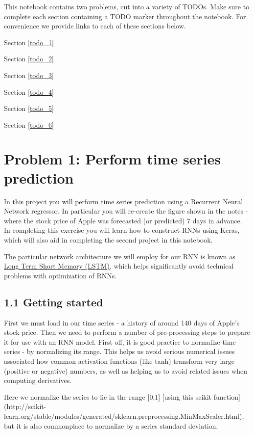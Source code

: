 \documentclass[11pt]{article}
\begin{document}
This notebook contains two problems, cut into a variety of TODOs. Make
sure to complete each section containing a TODO marker throughout the
notebook. For convenience we provide links to each of these sections
below.

Section \ref{todo_1}

Section \ref{todo_2}

Section \ref{todo_3}

Section \ref{todo_4}

Section \ref{todo_5}

Section \ref{todo_6}

    \section{Problem 1: Perform time series
prediction}\label{problem-1-perform-time-series-prediction}

In this project you will perform time series prediction using a
Recurrent Neural Network regressor. In particular you will re-create the
figure shown in the notes - where the stock price of Apple was
forecasted (or predicted) 7 days in advance. In completing this exercise
you will learn how to construct RNNs using Keras, which will also aid in
completing the second project in this notebook.

The particular network architecture we will employ for our RNN is known
as \href{https://en.wikipedia.org/wiki/Long_short-term_memory}{Long Term
Short Memory (LSTM)}, which helps significantly avoid technical problems
with optimization of RNNs.

    \subsection{1.1 Getting started}\label{getting-started}

First we must load in our time series - a history of around 140 days of
Apple's stock price. Then we need to perform a number of pre-processing
steps to prepare it for use with an RNN model. First off, it is good
practice to normalize time series - by normalizing its range. This helps
us avoid serious numerical issues associated how common activation
functions (like tanh) transform very large (positive or negative)
numbers, as well as helping us to avoid related issues when computing
derivatives.

Here we normalize the series to lie in the range {[}0,1{]} {[}using this
scikit
function{]}(http://scikit-learn.org/stable/modules/generated/sklearn.preprocessing.MinMaxScaler.html),
but it is also commonplace to normalize by a series standard deviation.
\end{document}
